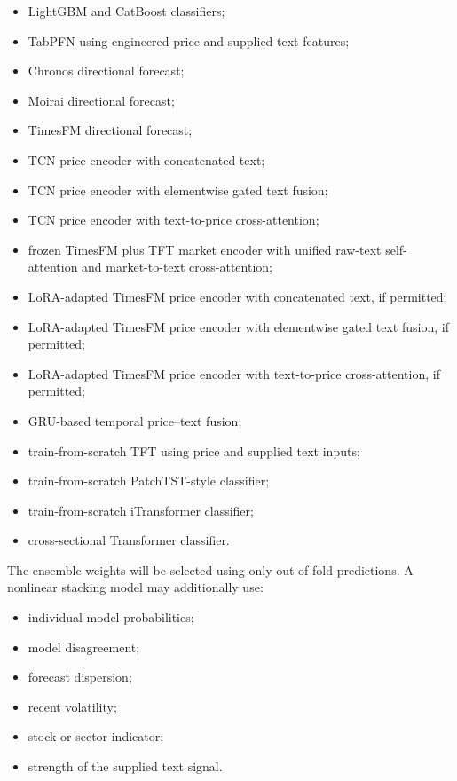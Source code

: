 \documentclass[11pt]{article}
\begin{document}
\begin{itemize}
    \item LightGBM and CatBoost classifiers;
    \item TabPFN using engineered price and supplied text features;
    \item Chronos directional forecast;
    \item Moirai directional forecast;
    \item TimesFM directional forecast;
    \item TCN price encoder with concatenated text;
    \item TCN price encoder with elementwise gated text fusion;
    \item TCN price encoder with text-to-price cross-attention;
    \item frozen TimesFM plus TFT market encoder with unified raw-text
    self-attention and market-to-text cross-attention;
    \item LoRA-adapted TimesFM price encoder with concatenated text, if
    permitted;
    \item LoRA-adapted TimesFM price encoder with elementwise gated text
    fusion, if permitted;
    \item LoRA-adapted TimesFM price encoder with text-to-price
    cross-attention, if permitted;
    \item GRU-based temporal price--text fusion;
    \item train-from-scratch TFT using price and supplied text inputs;
    \item train-from-scratch PatchTST-style classifier;
    \item train-from-scratch iTransformer classifier;
    \item cross-sectional Transformer classifier.
\end{itemize}

The ensemble weights will be selected using only out-of-fold predictions.
A nonlinear stacking model may additionally use:

\begin{itemize}
    \item individual model probabilities;
    \item model disagreement;
    \item forecast dispersion;
    \item recent volatility;
    \item stock or sector indicator;
    \item strength of the supplied text signal.
\end{itemize}
\end{document}
